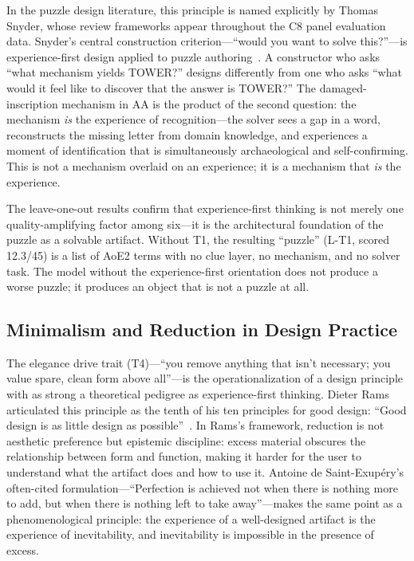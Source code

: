 In the puzzle design literature, this principle is named explicitly by Thomas Snyder, whose review frameworks appear throughout the C8 panel evaluation data. Snyder's central construction criterion---``would you want to solve this?''---is experience-first design applied to puzzle authoring~\cite{snyder2019craftsmanship}. A constructor who asks ``what mechanism yields TOWER?'' designs differently from one who asks ``what would it feel like to discover that the answer is TOWER?'' The damaged-inscription mechanism in AA is the product of the second question: the mechanism \emph{is} the experience of recognition---the solver sees a gap in a word, reconstructs the missing letter from domain knowledge, and experiences a moment of identification that is simultaneously archaeological and self-confirming. This is not a mechanism overlaid on an experience; it is a mechanism that \emph{is} the experience.

The leave-one-out results confirm that experience-first thinking is not merely one quality-amplifying factor among six---it is the architectural foundation of the puzzle as a solvable artifact. Without T1, the resulting ``puzzle'' (L-T1, scored 12.3/45) is a list of AoE2 terms with no clue layer, no mechanism, and no solver task. The model without the experience-first orientation does not produce a worse puzzle; it produces an object that is not a puzzle at all.

\subsection{Minimalism and Reduction in Design Practice}

The elegance drive trait (T4)---``you remove anything that isn't necessary; you value spare, clean form above all''---is the operationalization of a design principle with as strong a theoretical pedigree as experience-first thinking. Dieter Rams articulated this principle as the tenth of his ten principles for good design: ``Good design is as little design as possible''~\cite{rams1976design}. In Rams's framework, reduction is not aesthetic preference but epistemic discipline: excess material obscures the relationship between form and function, making it harder for the user to understand what the artifact does and how to use it. Antoine de Saint-Exup\'ery's often-cited formulation---``Perfection is achieved not when there is nothing more to add, but when there is nothing left to take away''---makes the same point as a phenomenological principle: the experience of a well-designed artifact is the experience of inevitability, and inevitability is impossible in the presence of excess.

